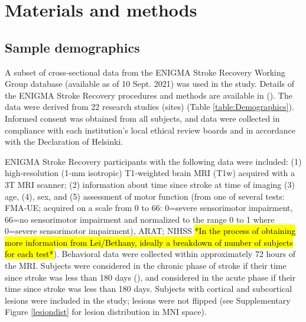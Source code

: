 \documentclass[10pt]{article}
\begin{document}
\section{Materials and methods}
\subsection{Sample demographics}
A subset of cross‐sectional data from the ENIGMA Stroke Recovery Working Group database (available as of 10 Sept. 2021) was used in the study. Details of the ENIGMA Stroke Recovery procedures and methods are available in (\cite{Liew2020-ps}). The data were derived from 22 research studies (sites) (Table \ref{table:Demographics}). Informed consent was obtained from all subjects, and data were collected in compliance with each institution’s local ethical review boards and in accordance with the Declaration of Helsinki.

ENIGMA Stroke Recovery participants with the following data were included: (1) high‐resolution (1‐mm isotropic) T1‐weighted brain MRI (T1w) acquired with a 3T MRI scanner; (2) information about time since stroke at time of imaging (3) age, (4), sex, and (5) assessment of motor function (from one of several tests: FMA‐UE; acquired on a scale from 0 to 66: 0=severe sensorimotor impairment, 66=no sensorimotor impairment and normalized to the range 0 to 1 where 0=severe sensorimotor impairment), ARAT; NIHSS \hl{*In the process of obtaining more information from Lei/Bethany, ideally a breakdown of number of subjects for each test*}). Behavioral data were collected within approximately 72 hours of the MRI. Subjects were considered in the chronic phase of stroke if their time since stroke was less than 180 days (\cite{Bernhardt2017-av}), and considered in the acute phase if their time since stroke was less than 180 days. Subjects with cortical and subcortical lesions were included in the study; lesions were not flipped (see Supplementary Figure \ref{lesiondist} for lesion distribution in MNI space). 
\end{document}
